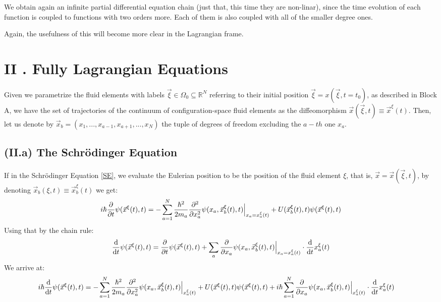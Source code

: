 \documentclass[11pt, a4paper]{article} %
\newcommand{\R}{\mathbb{R}} %
\begin{document}
We obtain again an infinite partial differential equation chain (just that, this time they are non-linar), since the time evolution of each function is coupled to functions with two orders more. Each of them is also coupled with all of the smaller degree ones.

Again, the usefulness of this will become more clear in the Lagrangian frame.

\newpage
{}
\section*{II . Fully Lagrangian Equations}\vspace{-0.3cm}
Given we parametrize the fluid elements with labels $\vec{\xi}\in\Omega_0\subseteq\R^N$ referring to their initial position $\vec{\xi}=x(\vec{\xi},t=t_0)$, as described in Block A, we have the set of trajectories of the continuum of configuration-space fluid elements as the diffeomorphism $\vec{x}(\vec{\xi},t) \equiv \vec{x}^\xi(t)$.
Then, let us denote by $\vec{x}_b=(x_1,...,x_{a-1}, x_{a+1},...,x_N)$ the tuple of degrees of freedom excluding the $a-th$ one $x_a$.\vspace{-0.3cm}
\subsection*{(II.a) The Schrödinger Equation}\vspace{-0.2cm}
If in the Schrödinger Equation \eqref{SE}, we evaluate the Eulerian position to be the position of the fluid element $\xi$, that is, $\vec{x}=\vec{x}(\vec{\xi},t)$, by denoting $\vec{x}_b(\xi,t)\equiv \vec{x}_b^\xi(t)$ we get:
\begin{equation}
i\hbar \pdv{}{t}\psi(\vec{x}^\xi(t),t)=-\sum_{a=1}^N \frac{\hbar^2}{2m_a}\pdv[2]{}{x_a}\psi(x_a, \vec{x}_b^\xi(t),t)\Big\rvert_{x_a=x^\xi_a(t)}+U(\vec{x}_b^\xi(t),t)\psi(\vec{x}^\xi(t),t)
\end{equation}
Using that by the chain rule:
\begin{equation}
\dv{}{t}\psi(\vec{x}^\xi(t), t)=\pdv{}{t}\psi(\vec{x}^\xi(t), t)+\sum_a \pdv{}{x_a}\psi(x_a,\vec{x}_b^\xi(t), t)\Big\rvert_{x_a=x^\xi_a(t)}\cdot \dv{}{t}x^\xi_a(t)
\end{equation}
We arrive at:\vspace{-0.1cm}
\begin{equation}\label{KinAdv}
\hspace*{-0.45cm} i\hbar \dv{}{t}\psi(\vec{x}^\xi(t),t)=-\sum_{a=1}^N \frac{\hbar^2}{2m_a}\pdv[2]{}{x_a}\psi(x_a, \vec{x}_b^\xi(t),t)\Big\rvert_{x^\xi_a(t)}+U(\vec{x}^\xi(t),t)\psi(\vec{x}^\xi(t),t)+i\hbar \sum_{a=1}^N  \pdv{}{x_a}\psi(x_a,\vec{x}_b^\xi(t), t)\Big\rvert_{x^\xi_a(t)}\cdot \dv{}{t}x^\xi_a(t)
\end{equation}
\end{document}
